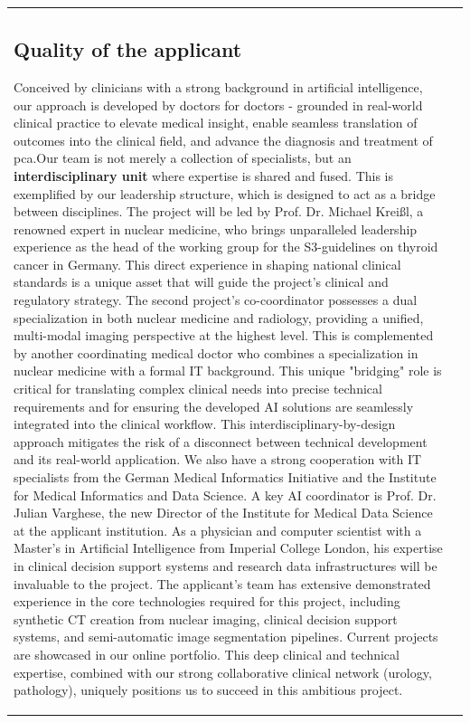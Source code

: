 \documentclass[11pt, a4paper]{article}
\begin{document}
\begin{longtable}{| p{} | p{} |}
\subsection{Quality of the applicant}
Conceived by clinicians with a strong background in artificial intelligence, our approach is developed by doctors for doctors - grounded in real-world clinical practice to elevate medical insight, enable seamless translation of outcomes into the clinical field, and advance the diagnosis and treatment of \gls{pca}.Our team is not merely a collection of specialists, but an \textbf{interdisciplinary unit} where expertise is shared and fused. This is exemplified by our leadership structure, which is designed to act as a bridge between disciplines. The project will be led by Prof. Dr. Michael Kreißl, a renowned expert in nuclear medicine, who brings unparalleled leadership experience as the head of the working group for the S3-guidelines on thyroid cancer in Germany. This direct experience in shaping national clinical standards is a unique asset that will guide the project's clinical and regulatory strategy. The second project's co-coordinator possesses a dual specialization in both nuclear medicine and radiology, providing a unified, multi-modal imaging perspective at the highest level. This is complemented by another coordinating medical doctor who combines a specialization in nuclear medicine with a formal IT background. This unique "bridging" role is critical for translating complex clinical needs into precise technical requirements and for ensuring the developed AI solutions are seamlessly integrated into the clinical workflow. This interdisciplinary-by-design approach mitigates the risk of a disconnect between technical development and its real-world application. We also have a strong cooperation with IT specialists from the German Medical Informatics Initiative and the Institute for Medical Informatics and Data Science. A key AI coordinator is Prof. Dr. Julian Varghese, the new Director of the Institute for Medical Data Science at the applicant institution. As a physician and computer scientist with a Master's in Artificial Intelligence from Imperial College London, his expertise in clinical decision support systems and research data infrastructures will be invaluable to the project.
The applicant's team has extensive demonstrated experience in the core technologies required for this project, including synthetic CT creation from nuclear imaging, clinical decision support systems, and semi-automatic image segmentation pipelines. Current projects are showcased in our online portfolio. This deep clinical and technical expertise, combined with our strong collaborative  clinical network (urology, pathology), uniquely positions us to succeed in this ambitious project.


\end{longtable}
\end{document}
